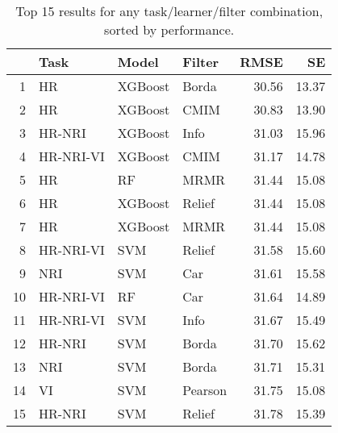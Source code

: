 \begin{table}[ht!]
\centering
\caption{Top 15 results for any task/learner/filter combination, sorted by performance.} 
\label{tab:perf-top-15}
\begin{tabular}{rlllrr}
  \hline
 & Task & Model & Filter & RMSE & SE \\ 
  \hline
1 & HR & XGBoost & Borda & 30.56 & 13.37 \\ 
  2 & HR & XGBoost & CMIM & 30.83 & 13.90 \\ 
  3 & HR-NRI & XGBoost & Info & 31.03 & 15.96 \\ 
  4 & HR-NRI-VI & XGBoost & CMIM & 31.17 & 14.78 \\ 
  5 & HR & RF & MRMR & 31.44 & 15.08 \\ 
  6 & HR & XGBoost & Relief & 31.44 & 15.08 \\ 
  7 & HR & XGBoost & MRMR & 31.44 & 15.08 \\ 
  8 & HR-NRI-VI & SVM & Relief & 31.58 & 15.60 \\ 
  9 & NRI & SVM & Car & 31.61 & 15.58 \\ 
  10 & HR-NRI-VI & RF & Car & 31.64 & 14.89 \\ 
  11 & HR-NRI-VI & SVM & Info & 31.67 & 15.49 \\ 
  12 & HR-NRI & SVM & Borda & 31.70 & 15.62 \\ 
  13 & NRI & SVM & Borda & 31.71 & 15.31 \\ 
  14 & VI & SVM & Pearson & 31.75 & 15.08 \\ 
  15 & HR-NRI & SVM & Relief & 31.78 & 15.39 \\ 
   \hline
\end{tabular}
\end{table}
